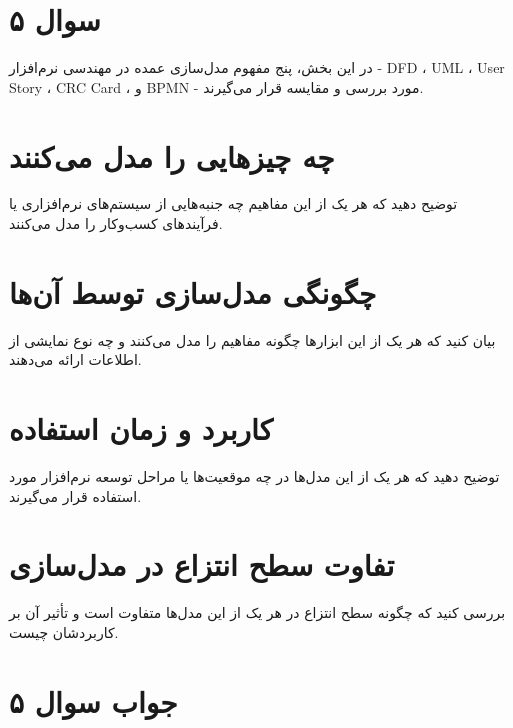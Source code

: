 \section*{سوال ۵}

در این بخش، پنج مفهوم مدل‌سازی عمده در مهندسی نرم‌افزار - DFD ، UML ، User Story ، CRC Card ، و BPMN - مورد بررسی و مقایسه قرار می‌گیرند.

\section*{چه چیزهایی را مدل می‌کنند}
توضیح دهید که هر یک از این مفاهیم چه جنبه‌هایی از سیستم‌های نرم‌افزاری یا فرآیندهای کسب‌وکار را مدل می‌کنند.

\section*{چگونگی مدل‌سازی توسط آن‌ها}
بیان کنید که هر یک از این ابزارها چگونه مفاهیم را مدل می‌کنند و چه نوع نمایشی از اطلاعات ارائه می‌دهند.

\section*{کاربرد و زمان استفاده}
توضیح دهید که هر یک از این مدل‌ها در چه موقعیت‌ها یا مراحل توسعه نرم‌افزار مورد استفاده قرار می‌گیرند.

\section*{تفاوت سطح انتزاع در مدل‌سازی}
بررسی کنید که چگونه سطح انتزاع در هر یک از این مدل‌ها متفاوت است و تأثیر آن بر کاربردشان چیست.



\section*{جواب سوال ۵}

